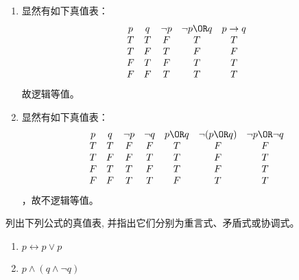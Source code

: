 \documentclass{ctexart}
\begin{document}
\begin{solution}
  \begin{enumerate}
    \item 显然有如下真值表：
      \[
        \begin{matrix}
          p & q & \neg p & \neg p \OR q & p \to q \\
          T & T & F      & T            & T       \\
          T & F & T      & F            & F       \\
          F & T & F      & T            & T       \\
          F & F & T      & T            & T       \\
        \end{matrix}
      \]
      故逻辑等值。
    \item 显然有如下真值表：
      \[
        \begin{matrix}
          p & q & \neg p & \neg q & p \OR q & \neg(p \OR q) & \neg p \OR \neg q \\
          T & T & F      & F      & T       & F             & F                 \\
          T & F & F      & T      & T       & F             & T                 \\
          F & T & T      & F      & T       & F             & T                 \\
          F & F & T      & T      & F       & T             & T                 \\
        \end{matrix}
      \]，故不逻辑等值。
  \end{enumerate}
\end{solution}
\begin{problem}\label{pro:4}
  列出下列公式的真值表, 并指出它们分别为重言式、矛盾式或协调式。
  \begin{enumerate}
    \item $p \leftrightarrow p \vee p$
    \item $p \wedge(q \wedge \neg q)$
  \end{enumerate}
\end{problem}
\end{document}
